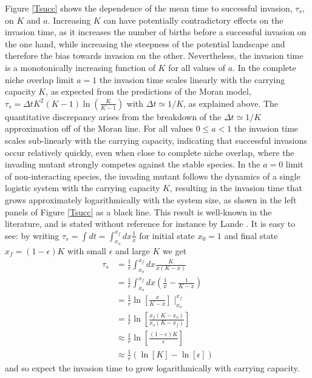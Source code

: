 Figure \ref{Tsucc} shows the dependence of the mean time to successful invasion, $\tau_s$, on $K$ and $a$. 
Increasing $K$ can have potentially contradictory effects on the invasion time, as it increases the number of births before a successful invasion on the one hand, while increasing the steepness of the potential landscape and therefore the bias towards invasion on the other. 
Nevertheless, the invasion time is a monotonically increasing function of $K$ for all values of $a$. In the complete niche overlap limit $a=1$ the invasion time scales linearly with the carrying capacity $K$, as expected from the predictions of the Moran model, $\tau_{s} = \Delta t K^2(K-1)\ln\left(\frac{K}{K-1}\right)$ with $\Delta t\simeq 1/K$, as explained above. %
The quantitative discrepancy arises from the breakdown of the $\Delta t\simeq 1/K$ approximation off of the Moran line. %
For all values $0\leq a<1$ the invasion time scales sub-linearly with the carrying capacity, indicating that successful invasions occur relatively quickly, even when close to complete niche overlap, where the invading mutant strongly competes against the stable species.
In the $a=0$ limit of non-interacting species, the invading mutant follows the dynamics of a single logistic system with the carrying capacity $K$, resulting in the invasion time that grows approximately logarithmically with the system size, as shown in the left panels of Figure \ref{Tsucc} as a black line. 
This result is well-known in the literature, and is stated without reference for instance by Lande \cite{Lande1993}. 
It is easy to see: by writing $\tau_s = \int dt = \int_{x_o}^{x_f} dx \frac{1}{\dot{x}}$ for initial state $x_0=1$ and final state $x_f=(1-\epsilon)K$ with small $\epsilon$ and large $K$ we get
\begin{align*}
\tau_s &= \frac{1}{r}\int_{x_o}^{x_f} dx \frac{K}{x(K-x)} \\
	   &= \frac{1}{r}\int_{x_o}^{x_f} dx \left(\frac{1}{x}-\frac{1}{K-x} \right) \\
	   &= \frac{1}{r}\ln\left[\frac{x}{K-x} \right]\mid_{x_o}^{x_f} \\
	   &= \frac{1}{r}\ln\left[\frac{x_f(K-x_o)}{x_o(K-x_f)} \right] \\
	   &\approx \frac{1}{r}\ln\left[\frac{(1-\epsilon)K}{\epsilon} \right] \\
	   &\approx \frac{1}{r}\left(\ln\left[K\right]-\ln\left[\epsilon\right]\right)
\end{align*}
and so expect the invasion time to grow logarithmically with carrying capacity. 

